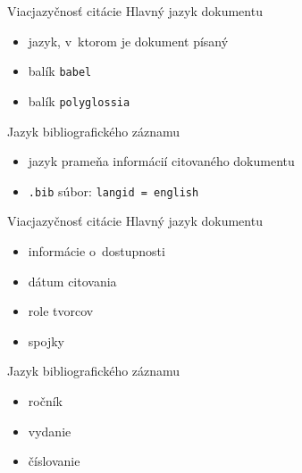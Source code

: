 \documentclass{beamer}
\newcommand{\cmd}[1]{\texttt{#1}}
\begin{document}
\begin{frame}{Viacjazyčnosť citácie}
Hlavný jazyk dokumentu
\begin{itemize}
\item jazyk, v~ktorom je dokument písaný
\item balík \texttt{babel} %
\item balík \texttt{polyglossia}
\end{itemize}

Jazyk bibliografického záznamu
\begin{itemize}
\item jazyk prameňa informácií citovaného dokumentu
\item \texttt{.bib} súbor: \cmd{langid = {english}}
\end{itemize}
\end{frame}

\begin{frame}{Viacjazyčnosť citácie}
Hlavný jazyk dokumentu
\begin{itemize}
\item informácie o~dostupnosti %
\item dátum citovania %
\item role tvorcov %
\item spojky %
\end{itemize}

Jazyk bibliografického záznamu
\begin{itemize}
\item ročník %
\item vydanie %
\item číslovanie %
\end{itemize}
\end{frame}
\end{document}
